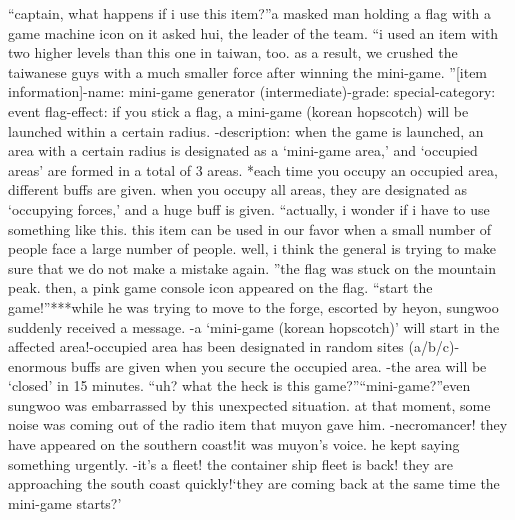 “captain, what happens if i use this item?”a masked man holding a flag with a game machine icon on it asked hui, the leader of the team.
“i used an item with two higher levels than this one in taiwan, too.
 as a result, we crushed the taiwanese guys with a much smaller force after winning the mini-game.
”[item information]-name: mini-game generator (intermediate)-grade: special-category: event flag-effect: if you stick a flag, a mini-game (korean hopscotch) will be launched within a certain radius.
-description: when the game is launched, an area with a certain radius is designated as a ‘mini-game area,’ and ‘occupied areas’ are formed in a total of 3 areas.
*each time you occupy an occupied area, different buffs are given.
 when you occupy all areas, they are designated as ‘occupying forces,’ and a huge buff is given.
“actually, i wonder if i have to use something like this.
 this item can be used in our favor when a small number of people face a large number of people.
 well, i think the general is trying to make sure that we do not make a mistake again.
”the flag was stuck on the mountain peak.
 then, a pink game console icon appeared on the flag.
“start the game!”***while he was trying to move to the forge, escorted by heyon, sungwoo suddenly received a message.
-a ‘mini-game (korean hopscotch)’ will start in the affected area!-occupied area has been designated in random sites (a/b/c)-enormous buffs are given when you secure the occupied area.
-the area will be ‘closed’ in 15 minutes.
“uh? what the heck is this game?”“mini-game?”even sungwoo was embarrassed by this unexpected situation.
 at that moment, some noise was coming out of the radio item that muyon gave him.
-necromancer! they have appeared on the southern coast!it was muyon’s voice.
 he kept saying something urgently.
-it’s a fleet! the container ship fleet is back! they are approaching the south coast quickly!‘they are coming back at the same time the mini-game starts?’

